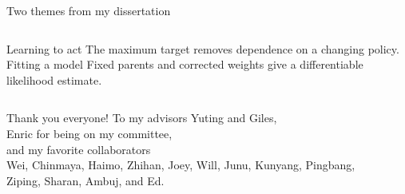 \begin{frame}{Two themes from my dissertation}
\begin{columns}[T,onlytextwidth]
{\Large\color{blue}Learning to act}\gap
The maximum target removes dependence on a changing policy.
\pause
{}
{\Large\color{green}Fitting a model}\gap
Fixed parents and corrected weights give a differentiable likelihood estimate.
\end{columns}
\end{frame}

\begin{frame}{Thank you everyone!}
\medskip
{\small To my advisors Yuting and Giles, \\
\qquad Enric for being on my committee,\\
and my favorite collaborators \\
\qquad Wei, Chinmaya, Haimo, Zhihan, Joey, Will, Junu, Kunyang, Pingbang, \\
\qquad Ziping, Sharan, Ambuj, and Ed.}
\end{frame}
